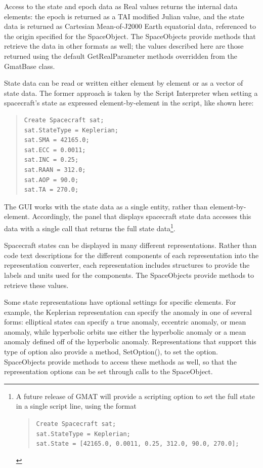 Access to the state and epoch data as Real values returns the internal data elements: the epoch
is returned as a TAI modified Julian value, and the state data is returned as Cartesian
Mean-of-J2000 Earth equatorial data, referenced to the origin specified for the SpaceObject.  The
SpaceObjects provide methods that retrieve the data in other formats as well; the values described
here are those returned using the default GetRealParameter methods overridden from the GmatBase
class.

State data can be read or written either element by element or as a vector of state data.  The
former approach is taken by the Script Interpreter when setting a spacecraft's state as expressed
element-by-element in the script, like shown here:

\begin{quote}
\begin{verbatim}
Create Spacecraft sat;
sat.StateType = Keplerian;
sat.SMA = 42165.0;
sat.ECC = 0.0011;
sat.INC = 0.25;
sat.RAAN = 312.0;
sat.AOP = 90.0;
sat.TA = 270.0;
\end{verbatim}
\end{quote}

\noindent The GUI works with the state data as a single entity, rather than element-by-element.
Accordingly, the panel that displays spacecraft state data accesses this data with a single call
that returns the full state data\footnote{A future release of GMAT will provide a scripting option
to set the full state in a single script line, using the format

\begin{quote}
\texttt{Create Spacecraft sat;\\
sat.StateType = Keplerian;\\
sat.State = [42165.0, 0.0011, 0.25, 312.0, 90.0, 270.0];}
\end{quote}}.

Spacecraft states can be displayed in many different representations.  Rather than code text
descriptions for the different components of each representation into the representation converter,
each representation includes structures to provide the labels and units used for the components.
The SpaceObjects provide methods to retrieve these values.

Some state representations have optional settings for specific elements.  For example, the Keplerian
representation can specify the anomaly in one of several forms: elliptical states can specify a true
anomaly, eccentric anomaly, or mean anomaly, while hyperbolic orbits use either the hyperbolic
anomaly or a mean anomaly defined off of the hyperbolic anomaly.  Representations that support this
type of option also provide a method, SetOption(), to set the option.  SpaceObjects provide methods
to access these methods as well, so that the representation options can be set through calls to the
SpaceObject.

